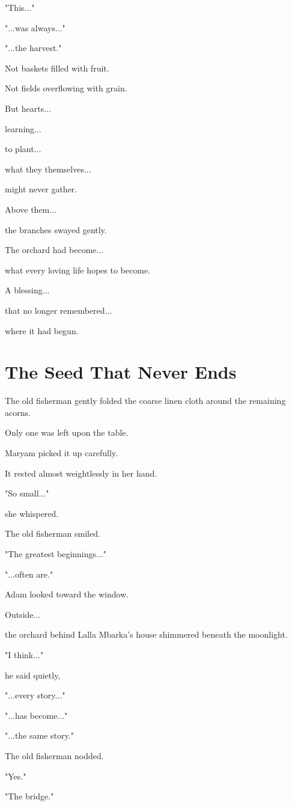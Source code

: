 \documentclass[12pt,openany]{book}
\begin{document}
"This..."

"...was always..."

"...the harvest."

Not baskets filled with fruit.

Not fields overflowing with grain.

But hearts...

learning...

to plant...

what they themselves...

might never gather.

Above them...

the branches swayed gently.

The orchard had become...

what every loving life hopes to become.

A blessing...

that no longer remembered...

where it had begun.
\section*{The Seed That Never Ends}

The old fisherman gently folded the coarse linen cloth around the remaining acorns.

Only one was left upon the table.

Maryam picked it up carefully.

It rested almost weightlessly in her hand.

"So small..."

she whispered.

The old fisherman smiled.

"The greatest beginnings..."

"...often are."

Adam looked toward the window.

Outside...

the orchard behind Lalla Mbarka's house shimmered beneath the moonlight.

"I think..."

he said quietly,

"...every story..."

"...has become..."

"...the same story."

The old fisherman nodded.

"Yes."

"The bridge."
\end{document}
